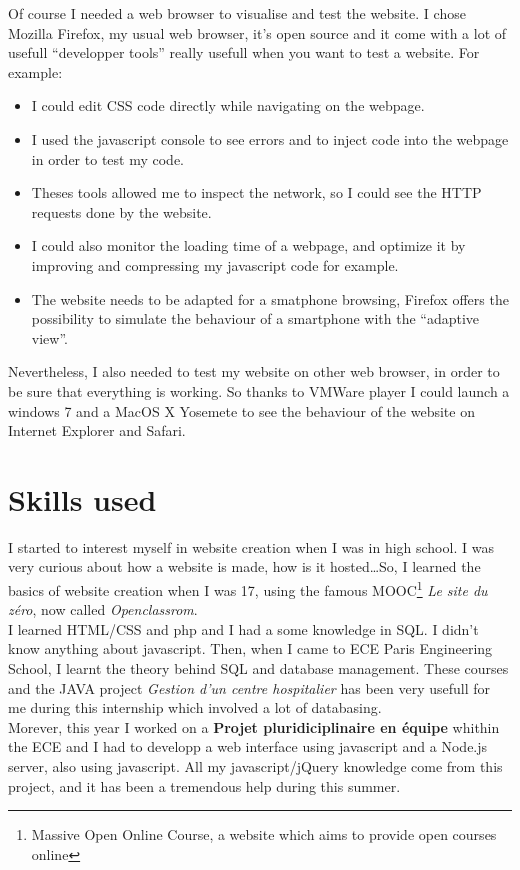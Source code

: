 \documentclass[10pt,a4paper]{article}
\begin{document}
Of course I needed a web browser to visualise and test the website. I chose Mozilla Firefox, my usual web browser, it's open source and it come with a lot of usefull ``developper tools'' really usefull when you want to test a website. For example:
\begin{itemize}
\item I could edit CSS code directly while navigating on the webpage.
\item I used the javascript console to see errors and to inject code into the webpage in order to test my code.
\item Theses tools allowed me to inspect the network, so I could see the HTTP requests done by the website.
\item I could also monitor the loading time of a webpage, and optimize it by improving and compressing my javascript code for example.
\item The website needs to be adapted for a smatphone browsing, Firefox offers the possibility to simulate the behaviour of a smartphone with the ``adaptive view''.
\end{itemize}

Nevertheless, I also needed to test my website on other web browser, in order to be sure that everything is working. So thanks to VMWare player I could launch a windows 7 and a MacOS X Yosemete to see the behaviour of the website on Internet Explorer and Safari.

\section{Skills used}

I started to interest myself in website creation when I was in high school. I was very curious about how a website is made, how is it hosted\ldots So, I learned the basics of website creation when I was 17, using the famous MOOC\footnote{Massive Open Online Course, a website which aims to provide open courses online} \textit{Le site du zéro}, now called \textit{Openclassrom}.\\
I learned HTML/CSS and php and I had a some knowledge in SQL. I didn't know anything about javascript.
Then, when I came to ECE Paris Engineering School, I learnt the theory behind SQL and database management. These courses and the JAVA project \textit{Gestion d'un centre hospitalier} has been very usefull for me during this internship which involved a lot of databasing.\\
Morever, this year I worked on a \textbf{Projet pluridiciplinaire en équipe} whithin the ECE and I had to developp a web interface using javascript and a Node.js server, also using javascript. All my javascript/jQuery knowledge come from this project, and it has been a tremendous help during this summer.\\
\end{document}
